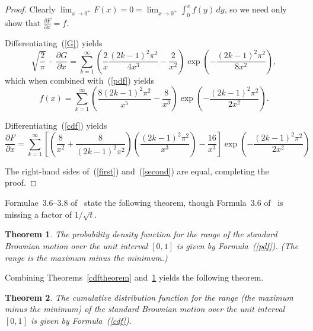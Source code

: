 \documentclass[12pt]{article}
\newtheorem{theorem}{Theorem}[]
\begin{document}
\begin{proof}
Clearly
$\lim_{x \to 0^+} F(x) = 0 = \lim_{x \to 0^+} \int_0^x f(y) \, dy$,
so we need only show that $\frac{\partial F}{\partial x} = f$.

Differentiating~(\ref{G}) yields
%
\begin{equation}
\sqrt{\frac{2}{\pi}} \;\cdot\; \frac{\partial G}{\partial x}
= \sum_{k=1}^\infty \left(
\frac{2}{x} \frac{(2k-1)^2 \pi^2}{4x^3} - \frac{2}{x^2} \right)
\exp\left( -\frac{(2k-1)^2 \pi^2}{8x^2} \right),
\end{equation}
%
which when combined with~(\ref{pdf}) yields
%
\begin{equation}
\label{first}
f(x) = \sum_{k=1}^\infty \left(
\frac{8 (2k-1)^2 \pi^2}{x^5} - \frac{8}{x^3} \right)
\exp\left( -\frac{(2k-1)^2 \pi^2}{2x^2} \right).
\end{equation}

Differentiating~(\ref{cdf}) yields
%
\begin{equation}
\label{second}
\frac{\partial F}{\partial x} = \sum_{k=1}^\infty
\left[ \left( \frac{8}{x^2} + \frac{8}{(2k-1)^2 \pi^2} \right)
\left( \frac{(2k-1)^2 \pi^2}{x^3} \right) - \frac{16}{x^3} \right]
\exp\left(-\frac{(2k-1)^2 \pi^2}{2x^2}\right)
\end{equation}

The right-hand sides of~(\ref{first}) and~(\ref{second}) are equal,
completing the proof.
\end{proof}


Formulae~3.6--3.8 of~\citet{feller} state the following theorem,
though Formula~3.6 of~\citet{feller} is missing a factor of $1/\sqrt{t}$.
%
\begin{theorem}
\label{pdftheorem}
The probability density function for the range
of the standard Brownian motion over the unit interval $[0, 1]$ is given
by Formula~(\ref{pdf}). (The range is the maximum minus the minimum.)
\end{theorem}

Combining Theorems~\ref{cdftheorem} and~\ref{pdftheorem} yields
the following theorem.
%
\begin{theorem}
\label{maincomborange}
The cumulative distribution function for the range (the maximum minus
the minimum) of the standard Brownian motion over the unit interval $[0, 1]$
is given by Formula~(\ref{cdf}).
\end{theorem}
\end{document}
